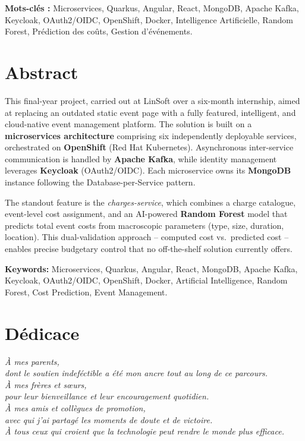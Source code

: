 \documentclass[12pt,a4paper]{report}
\begin{document}
\medskip
\noindent\textbf{Mots-cl\'es :} Microservices, Quarkus, Angular, React, MongoDB, Apache Kafka,
Keycloak, OAuth2/OIDC, OpenShift, Docker, Intelligence Artificielle, Random Forest,
Pr\'ediction des co\^uts, Gestion d'\'ev\'enements.

\bigskip

\chapter*{Abstract}

This final-year project, carried out at LinSoft over a six-month internship, aimed at
replacing an outdated static event page with a fully featured, intelligent, and cloud-native
event management platform. The solution is built on a \textbf{microservices architecture}
comprising six independently deployable services, orchestrated on \textbf{OpenShift} (Red Hat
Kubernetes). Asynchronous inter-service communication is handled by \textbf{Apache Kafka},
while identity management leverages \textbf{Keycloak} (OAuth2/OIDC). Each microservice owns
its \textbf{MongoDB} instance following the Database-per-Service pattern.

The standout feature is the \textit{charges-service}, which combines a charge catalogue,
event-level cost assignment, and an AI-powered \textbf{Random Forest} model that predicts
total event costs from macroscopic parameters (type, size, duration, location). This
dual-validation approach -- computed cost vs.\ predicted cost -- enables precise budgetary
control that no off-the-shelf solution currently offers.

\medskip
\noindent\textbf{Keywords:} Microservices, Quarkus, Angular, React, MongoDB, Apache Kafka,
Keycloak, OAuth2/OIDC, OpenShift, Docker, Artificial Intelligence, Random Forest,
Cost Prediction, Event Management.

\chapter*{D\'edicace}

\vspace*{3cm}
\begin{center}
\itshape\large
\`A mes parents,\\
dont le soutien indef\'ectible a \'et\'e mon ancre tout au long de ce parcours.\\[1cm]
\`A mes fr\`eres et s\oe urs,\\
pour leur bienveillance et leur encouragement quotidien.\\[1cm]
\`A mes amis et coll\`egues de promotion,\\
avec qui j'ai partag\'e les moments de doute et de victoire.\\[1cm]
\`A tous ceux qui croient que la technologie peut rendre le monde plus efficace.
\end{center}
\end{document}
